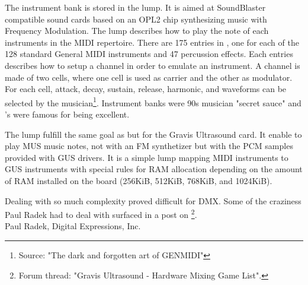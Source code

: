 \par
The instrument bank is stored in the  lump. It is aimed at SoundBlaster compatible sound cards based on an OPL2 chip synthesizing music with Frequency Modulation. The lump describes how to play the note of each instruments in the MIDI repertoire. There are 175 entries in , one for each of the 128 standard General MIDI instruments and 47 percussion effects. Each entries describes how to setup a channel in order to emulate an instrument. A channel is made of two cells, where one cell is used as carrier and the other as modulator. For each cell, attack, decay, sustain, release, harmonic, and waveforms can be selected by the musician\footnote{Source: "The dark and forgotten art of GENMIDI" }. Instrument banks were 90s musician "secret sauce" and \doom's were famous for being excellent.\\
\par
The  lump fulfill the same goal as  but for the Gravis Ultrasound card. It enable to play MUS music notes, not with an FM synthetizer but with the PCM samples provided with GUS drivers. It is a simple lump mapping MIDI instruments to GUS instruments with special rules for RAM allocation depending on the amount of RAM installed on the board (256KiB, 512KiB, 768KiB, and 1024KiB).\pagebreak



Dealing with so much complexity proved difficult for DMX. Some of the craziness Paul Radek had to deal with surfaced in a post on \footnote{Forum thread: "Gravis Ultrasound - Hardware Mixing Game List".}.\\





{Paul Radek, Digital Expressions, Inc.}\\
\par

